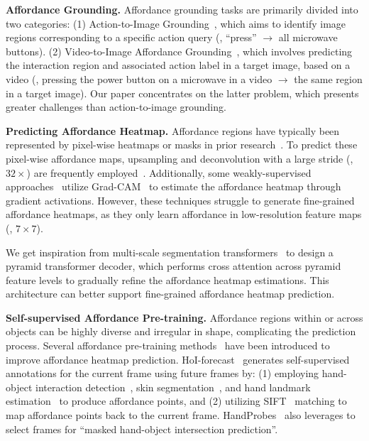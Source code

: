 \documentclass[10pt,twocolumn,letterpaper]{article}
\begin{document}
\noindent\textbf{Affordance Grounding.} Affordance grounding tasks are primarily divided into two categories: (1) Action-to-Image Grounding~\cite{hotspot,hagnet,probes,exoaffo}, which aims to identify image regions corresponding to a specific action query (\eg, ``press'' $\rightarrow$ all microwave buttons). (2) Video-to-Image Affordance Grounding~\cite{demo2vec,hotspot,hagnet}, which involves predicting the interaction region and associated action label in a target image, based on a video (\eg, pressing the power button on a microwave in a video  $\rightarrow$ the same region in a target image). Our paper concentrates on the latter problem, which presents greater challenges than action-to-image grounding.

\noindent\textbf{Predicting Affordance Heatmap.}
Affordance regions have typically been represented by pixel-wise heatmaps or masks in prior research~\cite{demo2vec,hotspot,hagnet,probes,exoaffo,oneshot_affo,affonet}. To predict these pixel-wise affordance maps, upsampling and deconvolution with a large stride (\eg, $32\times$) are frequently employed~\cite{demo2vec,probes,oneshot_affo}. Additionally, some weakly-supervised approaches~\cite{hotspot,hagnet,exoaffo} utilize Grad-CAM~\cite{gradcam} to estimate the affordance heatmap through gradient activations. However, these techniques struggle to generate fine-grained affordance heatmaps, as they only learn affordance in low-resolution feature maps (\eg, $7\times7$).

We get inspiration from multi-scale segmentation transformers~\cite{maskformer,mask2former,pvt,segformer} to design a pyramid transformer decoder, which performs cross attention across pyramid feature levels to gradually refine the affordance heatmap estimations. This architecture can better support fine-grained affordance heatmap prediction.

\noindent\textbf{Self-supervised Affordance Pre-training.} Affordance regions within or across objects can be highly diverse and irregular in shape, complicating the prediction process. Several affordance pre-training methods~\cite{jointhand,probes} have been introduced to improve affordance heatmap prediction. HoI-forecast~\cite{jointhand} generates self-supervised annotations for the current frame using future frames by: (1) employing hand-object interaction detection~\cite{100doh}, skin segmentation~\cite{skinseg}, and hand landmark estimation~\cite{cvzone} to produce affordance points, and (2) utilizing SIFT~\cite{sift} matching to map affordance points back to the current frame. HandProbes~\cite{probes} also leverages \cite{100doh} to select frames for ``masked hand-object intersection prediction''.
\end{document}
